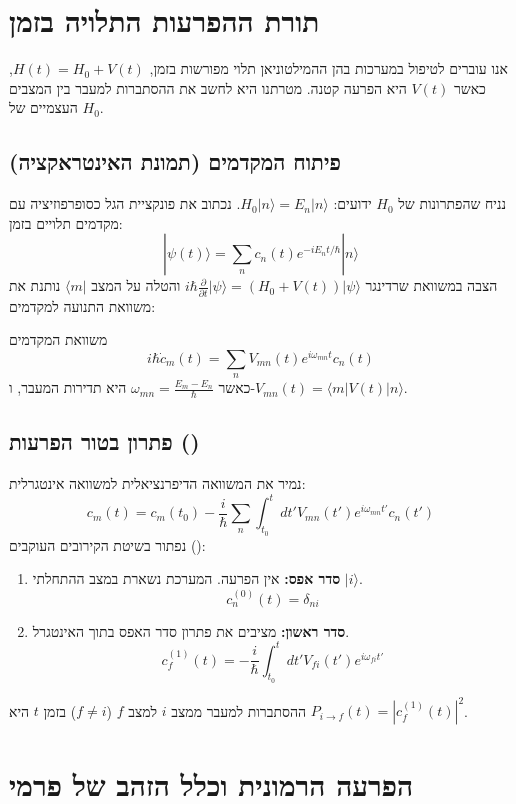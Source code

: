 \section{תורת ההפרעות התלויה בזמן}

אנו עוברים לטיפול במערכות בהן ההמילטוניאן תלוי מפורשות בזמן, $H(t) = H_0 + V(t)$, כאשר $V(t)$ היא הפרעה קטנה.
מטרתנו היא לחשב את ההסתברות למעבר בין המצבים העצמיים של $H_0$.

\subsection{פיתוח המקדמים (תמונת האינטראקציה)}
נניח שהפתרונות של $H_0$ ידועים: $H_0 |n\rangle = E_n |n\rangle$.
נכתוב את פונקציית הגל כסופרפוזיציה עם מקדמים תלויים בזמן:
\[ |\psi(t)\rangle = \sum_n c_n(t) e^{-i E_n t / \hbar} |n\rangle \]
הצבה במשוואת שרדינגר $i\hbar \frac{\partial}{\partial t} |\psi\rangle = (H_0 + V(t)) |\psi\rangle$ והטלה על המצב $\langle m|$ נותנת את משוואת התנועה למקדמים:

\begin{definitionbox}{משוואת המקדמים}
\[ i\hbar \dot{c}_m(t) = \sum_n V_{mn}(t) e^{i \omega_{mn} t} c_n(t) \]
כאשר $\omega_{mn} = \frac{E_m - E_n}{\hbar}$ היא תדירות המעבר, ו-$V_{mn}(t) = \langle m | V(t) | n \rangle$.
\end{definitionbox}

\subsection{\texorpdfstring{פתרון בטור הפרעות ()}{פתרון בטור הפרעות (Dyson Series)}}
נמיר את המשוואה הדיפרנציאלית למשוואה אינטגרלית:
\[ c_m(t) = c_m(t_0) - \frac{i}{\hbar} \sum_n \int_{t_0}^t dt' V_{mn}(t') e^{i \omega_{mn} t'} c_n(t') \]
נפתור בשיטת הקירובים העוקבים ():
\begin{enumerate}
    \item \textbf{סדר אפס:} אין הפרעה. המערכת נשארת במצב ההתחלתי $|i\rangle$.
    \[ c_n^{(0)}(t) = \delta_{ni} \]
    \item \textbf{סדר ראשון:} מציבים את פתרון סדר האפס בתוך האינטגרל.
    \[ c_f^{(1)}(t) = -\frac{i}{\hbar} \int_{t_0}^t dt' V_{fi}(t') e^{i \omega_{fi} t'} \]
\end{enumerate}
ההסתברות למעבר ממצב $i$ למצב $f$ ($f \neq i$) בזמן $t$ היא $P_{i \to f}(t) = |c_f^{(1)}(t)|^2$.

\section{הפרעה הרמונית וכלל הזהב של פרמי}

